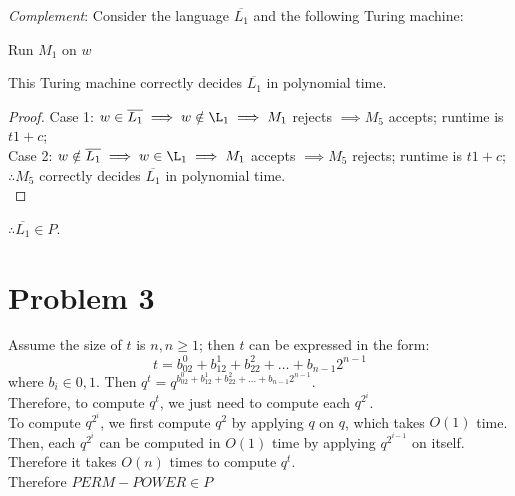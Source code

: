 \documentclass[letterpaper]{article}
\begin{document}
\textit{Complement}: Consider the language $\overline{L_1}$ and the following Turing machine:
\begin{algorithm}
    \caption{$M_5(w)$}
    \DontPrintSemicolon
    Run $M_1$ on $w$\;
\end{algorithm}
This Turing machine correctly decides $\overline{L_1}$ in polynomial time.
\begin{proof}
    Case 1: $w \in \overline{L_1} \implies w \notin \L_1 \implies M_1$ rejects $\implies M_5$ accepts; runtime is $t1+c$;\\
    Case 2: $w \notin \overline{L_1} \implies w \in \L_1 \implies M_1$ accepts $\implies M_5$ rejects; runtime is $t1+c$;\\
    $\therefore M_5$ correctly decides $\overline{L_1}$ in polynomial time.\\
\end{proof}
$\therefore \overline{L_1} \in P$.

\section*{Problem 3}
Assume the size of $t$ is $n, n\geq 1$; then $t$ can be expressed in the form:\\
$$t=b_02^0 + b_12^1 + b_22^2 + \dots + b_{n-1}2^{n-1}$$
where $b_i \in {0,1}$. Then $q^t=q^{b_02^0 + b_12^1 + b_22^2 + \dots + b_{n-1}2^{n-1}}$.\\
Therefore, to compute $q^t$, we just need to compute each $q^{2^i}$.\\
To compute $q^{2^i}$, we first compute $q^2$ by applying $q$ on $q$, which takes $O(1)$ time.\\
Then, each $q^{2^i}$ can be computed in $O(1)$ time by applying $q^{2^{i-1}}$ on itself.\\
Therefore it takes $O(n)$ times to compute $q^t$.\\
Therefore $PERM-POWER \in P$
\end{document}
